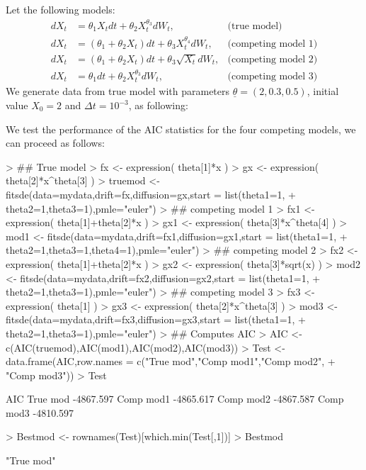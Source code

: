 Let the following models:
\begin{align*}
  dX_{t} &= \theta_{1} X_{t} dt + \theta_{2} X_{t}^{\theta_{3}} dW_{t},             &\text{(true model)}\\
  dX_{t} &= (\theta_{1}+\theta_{2} X_{t}) dt + \theta_{3} X_{t}^{\theta_{4}} dW_{t},&\text{(competing model 1)}\\
  dX_{t} &= (\theta_{1}+\theta_{2} X_{t}) dt + \theta_{3} \sqrt{X_{t}} dW_{t},      &\text{(competing model 2)}\\
  dX_{t} &= \theta_{1} dt + \theta_{2} X_{t}^{\theta_{3}} dW_{t},                   &\text{(competing model 3)}
\end{align*}
We generate data from true model with parameters $\underline{\theta}=(2,0.3,0.5)$, initial value $X_{0}=2$ and $\Delta t =10^{-3}$, as following:
\begin{Schunk}
\end{Schunk}
We test the performance of the AIC statistics for the four competing models, we can proceed as follows:
\begin{Schunk}
\begin{Sinput}
> ## True model
> fx <- expression( theta[1]*x )
> gx <- expression( theta[2]*x^theta[3] )
> truemod <- fitsde(data=mydata,drift=fx,diffusion=gx,start = list(theta1=1,
+                   theta2=1,theta3=1),pmle="euler")
> ## competing model 1
> fx1 <- expression( theta[1]+theta[2]*x )
> gx1 <- expression( theta[3]*x^theta[4] )
> mod1 <- fitsde(data=mydata,drift=fx1,diffusion=gx1,start = list(theta1=1,
+           theta2=1,theta3=1,theta4=1),pmle="euler")
> ## competing model 2
> fx2 <- expression( theta[1]+theta[2]*x )
> gx2 <- expression( theta[3]*sqrt(x) )
> mod2 <- fitsde(data=mydata,drift=fx2,diffusion=gx2,start = list(theta1=1,
+           theta2=1,theta3=1),pmle="euler")
> ## competing model 3
> fx3 <- expression( theta[1] )
> gx3 <- expression( theta[2]*x^theta[3] )
> mod3 <- fitsde(data=mydata,drift=fx3,diffusion=gx3,start = list(theta1=1,
+           theta2=1,theta3=1),pmle="euler")
> ## Computes AIC
> AIC <- c(AIC(truemod),AIC(mod1),AIC(mod2),AIC(mod3))
> Test <- data.frame(AIC,row.names = c("True mod","Comp mod1","Comp mod2",
+                    "Comp mod3"))
> Test
\end{Sinput}
\begin{Soutput}
                AIC
True mod  -4867.597
Comp mod1 -4865.617
Comp mod2 -4867.587
Comp mod3 -4810.597
\end{Soutput}
\begin{Sinput}
> Bestmod <- rownames(Test)[which.min(Test[,1])]
> Bestmod
\end{Sinput}
\begin{Soutput}
[1] "True mod"
\end{Soutput}
\end{Schunk}

